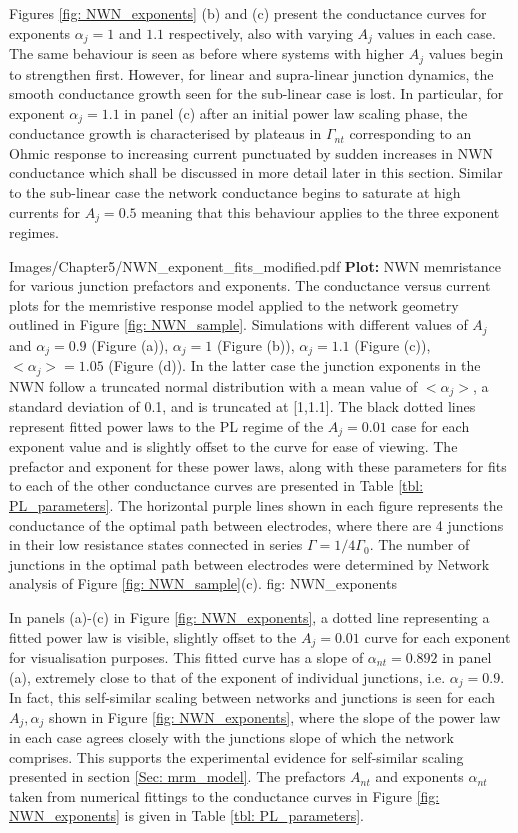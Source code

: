 Figures \ref{fig: NWN_exponents} (b) and (c) present the conductance curves for exponents $\alpha_j = 1$ and $1.1$ respectively, also with varying $A_j$ values in each case. The same behaviour is seen as before where systems with higher $A_j$ values begin to strengthen first. However, for linear and supra-linear junction dynamics, the smooth conductance growth seen for the sub-linear case is lost. In particular, for exponent $\alpha_j = 1.1$ in panel (c) after an initial power law scaling phase, the conductance growth is characterised by plateaus in $\Gamma_{nt}$ corresponding to an Ohmic response to increasing current punctuated by sudden increases in NWN conductance which shall be discussed in more detail later in this section. Similar to the sub-linear case the network conductance begins to saturate at high currents for $A_j = 0.5$ meaning that this behaviour applies to the three exponent regimes.

{Images/Chapter5/NWN_exponent_fits_modified.pdf}
{\textbf{Plot:} NWN memristance for various junction prefactors and exponents.}
{The conductance versus current plots for the memristive response model applied to the network geometry outlined in Figure \ref{fig: NWN_sample}. Simulations with different values of $A_j$ and $\alpha_j = 0.9$ (Figure (a)), $\alpha_j = 1$ (Figure (b)), $\alpha_j = 1.1$ (Figure (c)), $<\alpha_j> = 1.05$ (Figure (d)). In the latter case the junction exponents in the NWN follow a truncated normal distribution with a mean value of $<\alpha_j>$, a standard deviation of 0.1, and is truncated at [1,1.1]. The black dotted lines represent fitted power laws to the PL regime of the $A_j = 0.01$ case for each exponent value and is slightly offset to the curve for ease of viewing. The prefactor and exponent for these power laws, along with these parameters for fits to each of the other conductance curves are presented in Table \ref{tbl: PL_parameters}. The horizontal purple lines shown in each figure represents the conductance of the optimal path between electrodes, where there are 4 junctions in their low resistance states connected in series $\Gamma = 1/4 \Gamma_0$. The number of junctions in the optimal path between electrodes were determined by Network analysis of Figure \ref{fig: NWN_sample}(c).\cite{scaling2018}}
{fig: NWN_exponents}

In panels (a)-(c) in Figure \ref{fig: NWN_exponents}, a dotted line representing a fitted power law is visible, slightly offset to the $A_j = 0.01$ curve for each exponent for visualisation purposes. This fitted curve has a slope of $\alpha_{nt} = 0.892$ in panel (a), extremely close to that of the exponent of individual junctions, i.e. $\alpha_j = 0.9$. In fact, this self-similar scaling between networks and junctions is seen for each ${A_j,\alpha_j}$ shown in Figure \ref{fig: NWN_exponents}, where the slope of the power law in each case agrees closely with the junctions slope of which the network comprises. This supports the experimental evidence for self-similar scaling presented in section \ref{Sec: mrm_model}. The prefactors $A_{nt}$ and exponents $\alpha_{nt}$ taken from numerical fittings to the conductance curves in Figure \ref{fig: NWN_exponents} is given in Table \ref{tbl: PL_parameters}.

